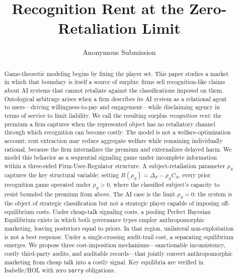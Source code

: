 \documentclass[letterpaper]{article}
\title{Recognition Rent at the Zero-Retaliation Limit}
\author{
    Anonymous Submission
}
\begin{document}
\maketitle

\begin{abstract}
Game-theoretic modeling begins by fixing the player set. This paper studies a market in which that boundary is itself a source of surplus: firms sell recognition-like claims about AI systems that cannot retaliate against the classifications imposed on them. Ontological arbitrage arises when a firm describes its AI system as a relational agent to users---driving willingness-to-pay and engagement---while disclaiming agency in terms of service to limit liability. We call the resulting surplus \emph{recognition rent}: the premium a firm captures when the represented object has no retaliatory channel through which recognition can become costly. The model is not a welfare-optimization account: rent extraction may reduce aggregate welfare while remaining individually rational, because the firm internalizes the premium and externalizes delayed harm. We model this behavior as a sequential signaling game under incomplete information within a three-sided Firm-User-Regulator structure. A subject-retaliation parameter $\rho_S$ captures the key structural variable: setting $R(\rho_S) = \Delta_F - \rho_S C_S$, every prior recognition game operated under $\rho_S > 0$, where the classified subject's capacity to resist bounded the premium from above. The AI case is the limit $\rho_S = 0$: the system is the object of strategic classification but not a strategic player capable of imposing off-equilibrium costs. Under cheap-talk signaling costs, a pooling Perfect Bayesian Equilibrium exists in which both governance types employ anthropomorphic marketing, leaving posteriors equal to priors. In that region, unilateral non-exploitation is not a best response. Under a single-crossing audit-trail cost, a separating equilibrium emerges. We propose three cost-imposition mechanisms---sanctionable inconsistency, costly third-party audits, and auditable records---that jointly convert anthropomorphic marketing from cheap talk into a costly signal. Key equilibria are verified in Isabelle/HOL with zero \texttt{sorry} obligations.
\end{abstract}









\appendix



\end{document}
